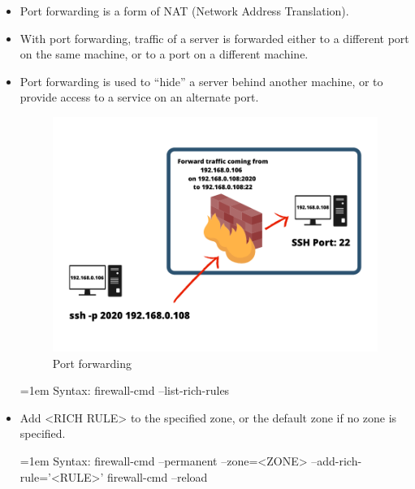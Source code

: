 
\begin{flushleft}

\begin{itemize}
	\item Port forwarding is a form of NAT (Network Address Translation). 
	\item With port forwarding, traffic of a server is forwarded either to a different port on the same machine, or to a port on a different machine. 
	\item Port forwarding is used to “hide” a server behind another machine, or to provide access to a service on an alternate port.

	\begin{figure}[h!]
		\centering
		\includegraphics[scale=.3]{content/chapter2/images/port.png}
		\caption{Port forwarding}
		\label{fig:command_prompt12}
	\end{figure}
	
	\bigskip
	\begin{tcolorbox}[breakable,notitle,boxrule=0pt,colback=pink,colframe=pink]
		\color{black}
		\font=1em
		Syntax: 
		\newline
		firewall-cmd --list-rich-rules
		\font=4pt
	\end{tcolorbox}
	
	\bigskip
	\bigskip
	\item Add <RICH RULE> to the specified zone, or the default zone if no zone is specified.
	\bigskip
	\begin{tcolorbox}[breakable,notitle,boxrule=0pt,colback=pink,colframe=pink]
		\color{black}
		\font=1em
		Syntax: 
		\newline
		firewall-cmd --permanent --zone=<ZONE> --add-rich-rule='<RULE>'
		\newline
		firewall-cmd --reload
		\font=4pt
	\end{tcolorbox}
	

\end{itemize}
\end{flushleft}
